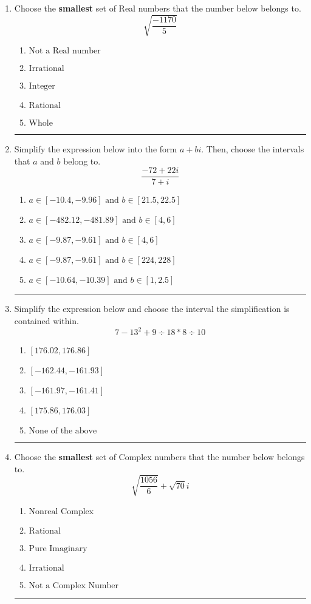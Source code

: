 \documentclass[14pt]{extbook}
\newcommand{\litem}[1]{\item#1\hspace*{-1cm}\rule{\textwidth}{0.4pt}}
\begin{document}
\begin{enumerate}
{\begin{enumerate}[label=\Alph*.]
\end{enumerate} }
\litem{
Choose the \textbf{smallest} set of Real numbers that the number below belongs to.\[ \sqrt{\frac{-1170}{5}} \]\begin{enumerate}[label=\Alph*.]
\item \( \text{Not a Real number} \)
\item \( \text{Irrational} \)
\item \( \text{Integer} \)
\item \( \text{Rational} \)
\item \( \text{Whole} \)

\end{enumerate} }
\litem{
Simplify the expression below into the form $a+bi$. Then, choose the intervals that $a$ and $b$ belong to.\[ \frac{-72 + 22 i}{7 + i} \]\begin{enumerate}[label=\Alph*.]
\item \( a \in [-10.4, -9.96] \text{ and } b \in [21.5, 22.5] \)
\item \( a \in [-482.12, -481.89] \text{ and } b \in [4, 6] \)
\item \( a \in [-9.87, -9.61] \text{ and } b \in [4, 6] \)
\item \( a \in [-9.87, -9.61] \text{ and } b \in [224, 228] \)
\item \( a \in [-10.64, -10.39] \text{ and } b \in [1, 2.5] \)

\end{enumerate} }
\litem{
Simplify the expression below and choose the interval the simplification is contained within.\[ 7 - 13^2 + 9 \div 18 * 8 \div 10 \]\begin{enumerate}[label=\Alph*.]
\item \( [176.02, 176.86] \)
\item \( [-162.44, -161.93] \)
\item \( [-161.97, -161.41] \)
\item \( [175.86, 176.03] \)
\item \( \text{None of the above} \)

\end{enumerate} }
\litem{
Choose the \textbf{smallest} set of Complex numbers that the number below belongs to.\[ \sqrt{\frac{1056}{6}}+\sqrt{70} i \]\begin{enumerate}[label=\Alph*.]
\item \( \text{Nonreal Complex} \)
\item \( \text{Rational} \)
\item \( \text{Pure Imaginary} \)
\item \( \text{Irrational} \)
\item \( \text{Not a Complex Number} \)


\end{enumerate}}
\end{enumerate}
\end{document}
